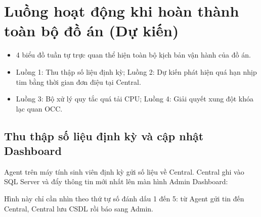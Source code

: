\documentclass[12pt,a4paper]{article}
\begin{document}
\section[Luồng hoạt động toàn bộ đồ án]{Luồng hoạt động khi hoàn thành toàn bộ đồ án (Dự kiến)}

\begin{summarybox}
\begin{itemize}[leftmargin=1.5em, itemsep=1pt]
  \item 4 biểu đồ tuần tự trực quan thể hiện toàn bộ kịch bản vận hành của đồ án.
  \item Luồng 1: Thu thập số liệu định kỳ; Luồng 2: Dự kiến phát hiện quá hạn nhịp tim bằng thời gian đơn điệu tại Central.
  \item Luồng 3: Bộ xử lý quy tắc quá tải CPU; Luồng 4: Giải quyết xung đột khóa lạc quan OCC.
\end{itemize}
\end{summarybox}

\subsection{Thu thập số liệu định kỳ và cập nhật Dashboard}
Agent trên máy tính sinh viên định kỳ gửi số liệu về Central. Central ghi vào SQL Server và đẩy thông tin mới nhất lên màn hình Admin Dashboard:

Hình này chỉ cần nhìn theo thứ tự số đánh dấu 1 đến 5: từ Agent gửi tin đến Central, Central lưu CSDL rồi báo sang Admin.
\end{document}

